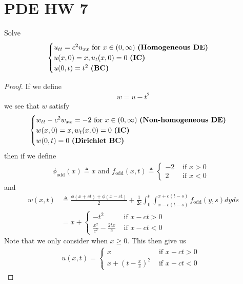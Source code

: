 \documentclass{report}
\begin{document}
\section{PDE HW 7}
\begin{question}{}{}
Solve 
\begin{align*}
\begin{cases}
  u_{tt}=c^2u_{xx}\text{ for }x\in (0,\infty)\text{ \textbf{(Homogeneous DE)} } \\
  u(x,0)=x,u_t(x,0)=0\text{ \textbf{(IC)} }\\
  u(0,t)=t^2\text{ \textbf{(BC)} }
\end{cases}
\end{align*}
\end{question}
\begin{proof}
If we define 
\begin{align*}
w=u-t^2
\end{align*}
we see that $w$ satisfy 
\begin{align*}
\begin{cases}
  w_{tt}-c^2w_{xx}=-2\text{ for }x\in (0,\infty)\text{ \textbf{(Non-homogeneous DE)} } \\
  w(x,0)=x,w_t(x,0)=0\text{ \textbf{(IC)} }\\
  w(0,t)=0\text{ \textbf{(Dirichlet BC)} }
\end{cases}
\end{align*}
then if we define 
\begin{align*}
\phi_{\operatorname{odd}}(x)\triangleq x\text{ and }f_{\operatorname{odd}}(x,t)\triangleq \begin{cases}
  -2& \text{ if $x>0$ }\\
  2& \text{ if $x<0$ }
\end{cases} 
\end{align*}
and 
\begin{align*}
  w(x,t)&\triangleq  \frac{\phi (x+ct)+ \phi (x-ct)}{2} + \frac{1}{2c}\int_0^t \int^{x+c(t-s)}_{x-c(t-s)} f_{\operatorname{odd}}(y,s)dyds  \\
  &= x+  \begin{cases}
   -t^2& \text{ if $x-ct>0$ }\\
    \frac{x^2}{c^2}-\frac{2tx}{c}& \text{ if $x-ct<0$ }
  \end{cases}
\end{align*}
Note that we only consider when $x\geq 0$. This then give us 
\begin{align*}
u(x,t)= \begin{cases}
  x &\text{ if $x-ct>0$ }\\
  x+ (t-\frac{x}{c})^2 &\text{ if $x-ct<0$ }
\end{cases}
\end{align*}
\end{proof}
\end{document}
